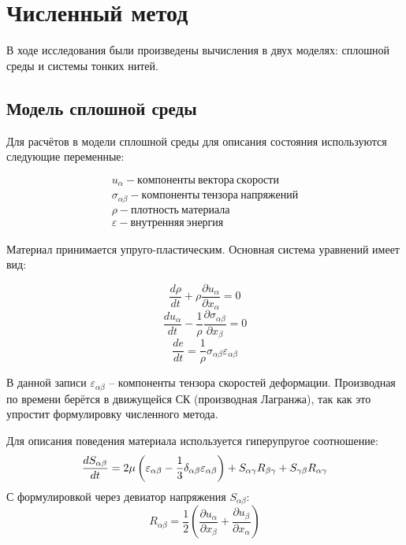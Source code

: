 \chapter{Численный метод}\label{ch:numeric}
В ходе исследования были произведены вычисления в двух моделях: сплошной среды и системы тонких нитей.

\section{Модель сплошной среды}\label{sec:model-simple}
Для расчётов в модели сплошной среды для описания состояния используются следующие переменные:

\begin{gather*}
    u_{\alpha} - компоненты~вектора~скорости \\
    \sigma_{\alpha\beta} - компоненты~тензора~напряжений \\
    \rho - плотность~материала \\
    \varepsilon - внутренняя~энергия
\end{gather*}

Материал принимается упруго-пластическим.
Основная система уравнений имеет вид:

\begin{equation}
    \frac{d\rho}{dt} + \rho \frac{\partial u_{\alpha}}{\partial x_{\alpha}} = 0
\end{equation}
\begin{equation}
    \frac{d u_{\alpha}}{dt} - \frac{1}{\rho} \frac{\partial \sigma_{\alpha \beta}}{\partial x_{\beta}} = 0
\end{equation}
\begin{equation}
    \frac{de}{dt} = \frac{1}{\rho} \sigma_{\alpha \beta} \varepsilon_{\alpha \beta}
\end{equation}

В данной записи $\varepsilon_{\alpha \beta}$ -- компоненты тензора скоростей деформации.
Производная по времени берётся в движущейся СК (производная Лагранжа), так как это упростит формулировку численного метода.

Для описания поведения материала используется гиперупругое соотношение:
\begin{equation}
    \frac{d S_{\alpha \beta}}{d t} = 2 \mu \left( \varepsilon_{\alpha \beta} - \\
    \frac{1}{3} \delta_{\alpha \beta} \varepsilon_{\alpha \beta} \right) + S_{\alpha \gamma} R_{\beta \gamma} + \\
    S_{\gamma \beta} R_{\alpha \gamma}
\end{equation}
С формулировкой через девиатор напряжения $S_{\alpha\beta}$:
\begin{equation}
    R_{\alpha \beta} = \frac{1}{2} \left( \frac{\partial u_{\alpha}}{\partial x_{\beta}} + \frac{\partial u_{\beta}}{\partial x_{\alpha}} \right)
\end{equation}

